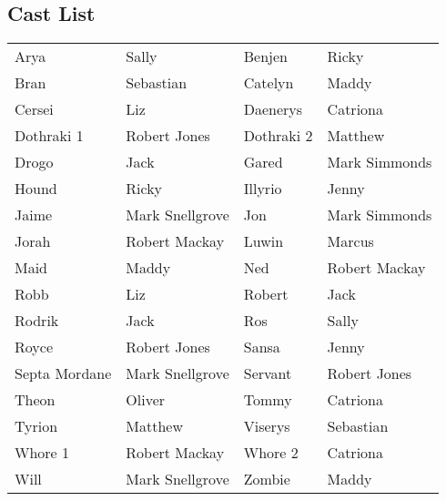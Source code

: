 \subsection*{Cast List}
\begin{tabular}{ll|ll}\\
Arya & Sally &  Benjen & Ricky\\
Bran & Sebastian &  Catelyn & Maddy\\
Cersei & Liz &  Daenerys & Catriona\\
Dothraki 1 & Robert Jones &  Dothraki 2 & Matthew\\
Drogo & Jack &  Gared & Mark Simmonds\\
Hound & Ricky &  Illyrio & Jenny\\
Jaime & Mark Snellgrove &  Jon & Mark Simmonds\\
Jorah & Robert Mackay &  Luwin & Marcus\\
Maid & Maddy &  Ned & Robert Mackay\\
Robb & Liz &  Robert & Jack\\
Rodrik & Jack &  Ros & Sally\\
Royce & Robert Jones &  Sansa & Jenny\\
Septa Mordane & Mark Snellgrove &  Servant & Robert Jones\\
Theon & Oliver &  Tommy & Catriona\\
Tyrion & Matthew &  Viserys & Sebastian\\
Whore 1 & Robert Mackay &  Whore 2 & Catriona\\
Will & Mark Snellgrove &  Zombie & Maddy\\
\end{tabular}
